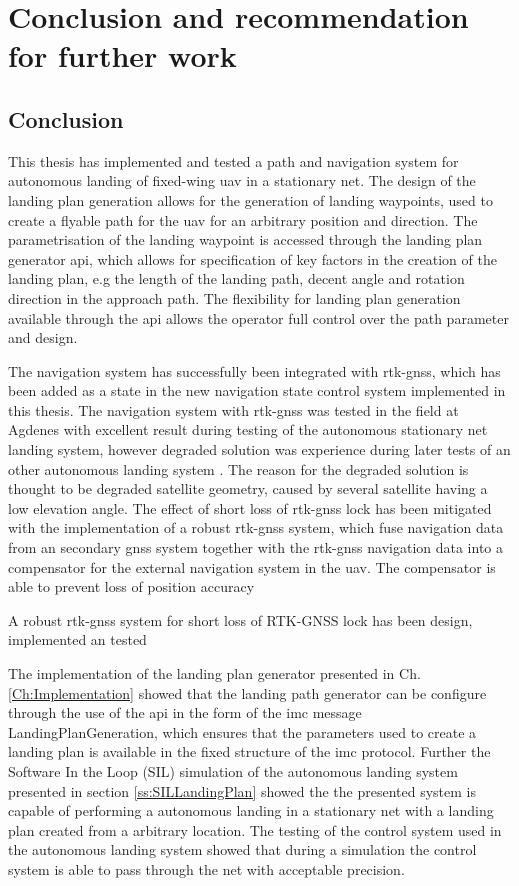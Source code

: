 \chapter{Conclusion and recommendation for further work}
\section{Conclusion}
This thesis has implemented and tested a path and navigation system for autonomous landing of fixed-wing \gls{uav} in a stationary net. The design of the landing plan generation allows for the generation of landing waypoints, used to create a flyable path for the \gls{uav} for an arbitrary position and direction. The parametrisation of the landing waypoint is accessed through the landing plan generator \gls{api}, which allows for specification of key factors in the creation of the landing plan, e.g the length of the landing path, decent angle and rotation direction in the approach path. The flexibility for landing plan generation available through the \gls{api} allows the operator full control over the path parameter and design.

The navigation system has successfully been integrated with \gls{rtk-gnss}, which has been added as a state in the new navigation state control system implemented in this thesis. The navigation system with \gls{rtk-gnss} was tested in the field at Agdenes with excellent result during testing of the autonomous stationary net landing system, however degraded solution was experience during later tests of an other autonomous landing system \citep{Sigurd,Jostein}. The reason for the degraded solution is thought to be degraded satellite geometry, caused by several satellite having a low elevation angle. The effect of short loss of \gls{rtk-gnss} lock has been mitigated with the implementation of a robust \gls{rtk-gnss} system, which fuse navigation data from an secondary \gls{gnss} system together with the \gls{rtk-gnss} navigation data into a compensator for the external navigation system in the \gls{uav}. The compensator is able to prevent loss of position accuracy 





A robust \gls{rtk-gnss} system for short loss of RTK-GNSS lock has been design, implemented an tested


The implementation of the landing plan generator presented in Ch. \ref{Ch:Implementation} showed that the landing path generator can be configure through the use of the \gls{api} in the form of the \gls{imc} message LandingPlanGeneration, which ensures that the parameters used to create a landing plan is available in the fixed structure of the \gls{imc} protocol. Further the Software In the Loop (SIL) simulation of the autonomous landing system presented in section \ref{ss:SILLandingPlan} showed the the presented system is capable of performing a autonomous landing in a stationary net with a landing plan created from a arbitrary location. The testing of the control system used in the autonomous landing system showed that during a simulation the control system is able to pass through the net with acceptable precision.


